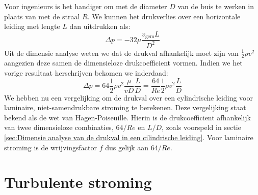 Voor ingenieurs is het handiger om met de diameter $D$ van de buis te werken in plaats van met de straal $R$. We kunnen het drukverlies over een horizontale leiding met lengte $L$ dan uitdrukken als:
\begin{equation}
	\Delta p = - 32 \mu \frac{v_{\text{gem}} L}{ D^2}
\end{equation}
Uit de dimensie analyse weten we dat de drukval afhankelijk moet zijn van $\frac{1}{2}\rho v^2$ aangezien deze samen de dimensieloze drukcoefficient vormen. Indien we het vorige resultaat herschrijven bekomen we inderdaad:
\begin{equation}
	\Delta p = 64 \frac{1}{2}\rho v^2 \frac{\mu}{v D} \frac{L}{D} = \frac{64}{Re} \frac{1}{2}\rho v^2 \frac{L}{D}
	\label{eqn:drukval bij laminaire stroming}
\end{equation}
We hebben nu een vergelijking om de drukval over een cylindrische leiding voor laminaire, niet-samendrukbare stroming te berekenen. Deze vergelijking staat bekend als de wet van Hagen-Poiseuille. Hierin is de drukcoefficient afhankelijk van twee dimensieloze combinaties, $64/Re$ en $L/D$, zoals voorspeld in sectie \ref{sec:Dimensie analyse van de drukval in een cilindrische leiding}. Voor laminaire stroming is de wrijvingsfactor $f$ dus gelijk aan $64/Re$.

	\FloatBarrier
	\section{Turbulente stroming}
	\label{sec:Turbulente stroming}

